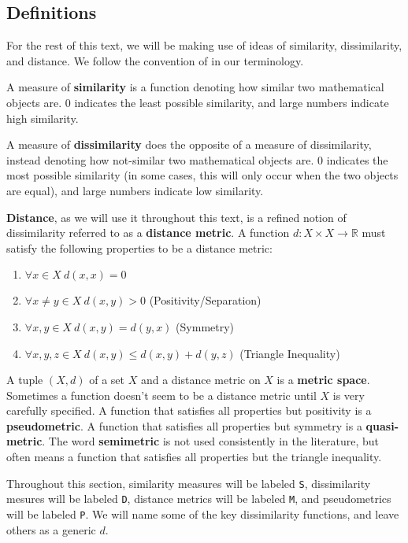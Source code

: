 \documentclass[12pt,a4paper]{article}
\newcommand{\1}[1]{\mathds{1}\left[#1\right]}
\newcommand{\R}{\mathbb{R}}
\begin{document}
\subsection{Definitions}
For the rest of this text, we will be making use of ideas of similarity, dissimilarity, and distance. We follow the convention of \cite{esl} in our terminology.

A measure of \textbf{similarity} is a function denoting how similar two mathematical objects are. 0 indicates the least possible similarity, and large numbers indicate high similarity.

A measure of \textbf{dissimilarity} does the opposite of a measure of dissimilarity, instead denoting how not-similar two mathematical objects are. 0 indicates the most possible similarity (in some cases, this will only occur when the two objects are equal), and large numbers indicate low similarity.

\textbf{Distance}, as we will use it throughout this text, is a refined notion of dissimilarity referred to as a \textbf{distance metric}. A function $d:X\times X\to \R$ must satisfy the following properties to be a distance metric:
\begin{enumerate}
    \item $\forall x\in X\ d(x,x)=0$
    \item $\forall x\neq y\in X\ d(x,y)>0$ (Positivity/Separation)
    \item $\forall x,y\in X\ d(x,y)=d(y,x)$ (Symmetry)
    \item $\forall x,y,z\in X\ d(x,y)\leq d(x,y)+d(y,z)$ (Triangle Inequality)
\end{enumerate}
A tuple $(X,d)$ of a set $X$ and a distance metric on $X$ is a \textbf{metric space}. Sometimes a function doesn't seem to be a distance metric until $X$ is very carefully specified. A function that satisfies all properties but positivity is a \textbf{pseudometric}. A function that satisfies all properties but symmetry is a \textbf{quasi-metric}. The word \textbf{semimetric} is not used consistently in the literature, but often means a function that satisfies all properties but the triangle inequality.

Throughout this section, similarity measures will be labeled \texttt{S}, dissimilarity mesures will be labeled \texttt{D}, distance metrics will be labeled \texttt{M}, and pseudometrics will be labeled \texttt{P}. We will name some of the key dissimilarity functions, and leave others as a generic $d$.
\end{document}
